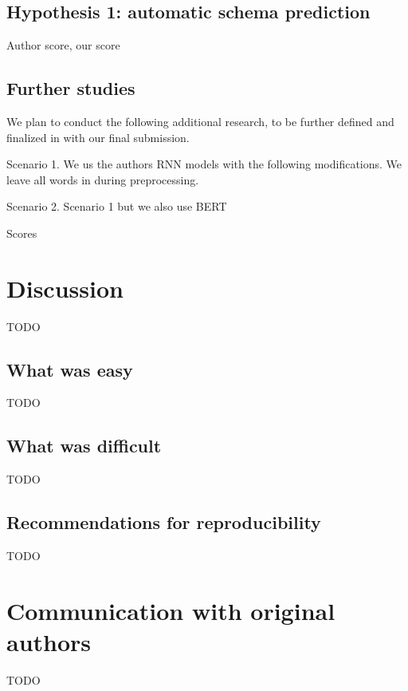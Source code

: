 \documentclass[11pt,a4paper]{article}
\begin{document}
\subsection{Hypothesis 1: automatic schema prediction}

Author score, our score 

\subsection{Further studies}
\label{further_studies}

We plan to conduct the following additional research, to be further defined and finalized in with our final submission. 

Scenario 1. We us the authors RNN models with the following modifications. We leave all words in during preprocessing. 

Scenario 2. Scenario 1 but we also use BERT 

Scores

\section{Discussion}
TODO
\subsection{What was easy}
TODO
\subsection{What was difficult}
TODO
\subsection{Recommendations for reproducibility}
TODO
\section{Communication with original authors}
TODO



\end{document}

